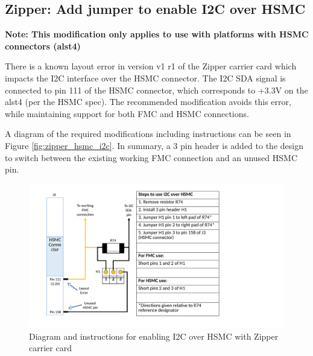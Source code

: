 \documentclass{article}
\begin{document}
\subsection*{Zipper: Add jumper to enable I2C over HSMC}
\normalsize
\textbf{Note: This modification only applies to use with platforms with HSMC connectors (alst4)}\par\medskip
\noindent There is a known layout error in version v1 r1 of the Zipper carrier card which impacts the I2C interface over the HSMC connector. The I2C SDA signal is connected to pin 111 of the HSMC connector, which corresponds to +3.3V on the alst4 (per the HSMC spec). The recommended modification avoids this error, while maintaining support for both FMC and HSMC connections.\par\medskip
\noindent A diagram of the required modifications including instructions can be seen in Figure \ref{fig:zipper_hsmc_i2c}. In summary, a 3 pin header is added to the design to switch between the existing working FMC connection and an unused HSMC pin.
  	\begin{figure}[ht]
	\centering
		\includegraphics[scale=0.7]{zipper_hsmc_i2c}
		\caption{Diagram and instructions for enabling I2C over HSMC with Zipper carrier card}
	\end{figure}
		\label{fig:zipper_hsmc_i2c}
\end{document}
